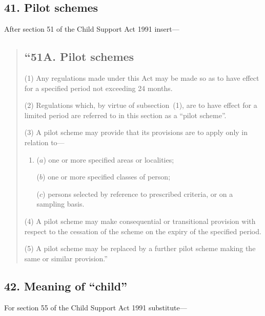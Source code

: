 \documentclass[12pt,a4paper]{article}
\begin{document}

\subsection{41. Pilot schemes}

After section 51 of the Child Support Act 1991 insert---

\begin{quotation}
\subsection*{``51A. Pilot schemes}

(1) Any regulations made under this Act may be made so as to have effect for a specified period not exceeding 24 months.

(2)
Regulations which, by virtue of subsection~(1), are to have effect for a limited period are referred to in this section as a “pilot scheme”.

(3) A pilot scheme may provide that its provisions are to apply only in relation to---
\begin{enumerate}\item[]
($a$) one or more specified areas or localities;

($b$) one or more specified classes of person;

($c$) persons selected by reference to prescribed criteria, or on a sampling basis.
\end{enumerate}

(4)
A pilot scheme may make consequential or transitional provision with respect to the cessation of the scheme on the expiry of the specified period.

(5)
A pilot scheme may be replaced by a further pilot scheme making the same or similar provision.''
\end{quotation}

\subsection{42. Meaning of ``child''}

For section 55 of the Child Support Act 1991 substitute---
\end{document}
